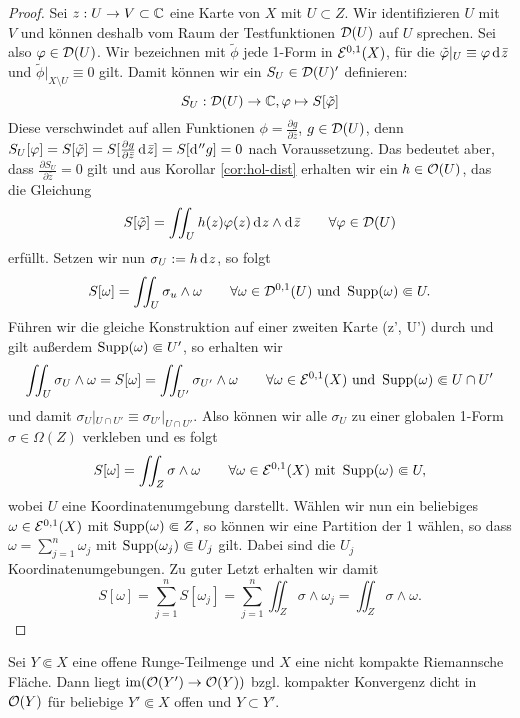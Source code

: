 \begin{proof}
  Sei $z: U \rightarrow V \subset \mathbb{C}$ eine Karte von $X$ mit $U \subset
  Z$. Wir identifizieren $U$ mit $V$ und können deshalb vom Raum der
  Testfunktionen $\mathcal{D}(U)$ auf $U$ sprechen. Sei also $\varphi \in
  \mathcal{D}(U)$. Wir bezeichnen mit $\tilde \phi$ jede 1-Form in
  $\mathcal{E}^{0,1}(X)$, für die $\tilde \phi|_U \equiv \phi \d[\bar z]$ und
  $\tilde \phi |_{X \setminus U} \equiv 0$ gilt. 
  Damit können wir ein $S_U \in \mathcal{D}(U)'$ definieren:
  \[
  S_U: \mathcal{D}(U) \rightarrow \mathbb{C}, \varphi \mapsto S[\tilde {\varphi}]
  \]
  Diese verschwindet auf allen Funktionen $\phi = \frac{\partial
    g}{\partial \bar z}$, $g \in \mathcal{D}(U)$, denn $S_U[\phi] = S[\tilde
  \phi] = S[ \frac{\partial g}{\partial \bar z} \d[\bar z]] =
  S[\d[''g]] = 0$ nach Voraussetzung. Das bedeutet aber, dass
  $\frac{\partial S_U}{\partial \bar z} = 0$ gilt und aus Korollar
  \ref{cor:hol-dist} erhalten wir ein $h \in \mathcal{O}(U)$, das die Gleichung
  \[
  S[\tilde \phi] = \iint_U h(z) \phi(z) \d[z] \wedge \d[\bar z] \qquad
  \forall \phi \in \dist(U)
  \]
  erfüllt. Setzen wir nun $\sigma_U := h \d[z]$, so folgt
  \[
  S[\omega] = \iint_U \sigma_u \wedge \omega \qquad \forall \omega \in
  \mathcal{D}^{0,1}(U) \text{ und } \operatorname{Supp}(\omega) \Subset U.
  \]
  Führen wir die gleiche Konstruktion auf einer zweiten Karte (z', U')
  durch und gilt außerdem $\operatorname{Supp}(\omega) \Subset U'$, so
  erhalten wir
  \[
  \iint_U \sigma_U \wedge \omega = S[\omega] = \iint_{U'} \sigma_{U'}
  \wedge \omega \qquad \forall \omega \in \mathcal{E}^{0,1}(X) \text{ und }
  \operatorname{Supp}(\omega) \Subset U \cap U'
  \]
  und damit $\sigma_U|_{U \cap U'} \equiv \sigma_{U'}|_{U \cap
    U'}$. Also können wir alle $\sigma_U$ zu einer globalen 1-Form
  $\sigma \in \Omega(Z)$ verkleben und es folgt
  \[
  S[\omega] = \iint_Z \sigma \wedge \omega \qquad \forall \omega \in
  \mathcal{E}^{0,1}(X) \text{ mit } \operatorname{Supp}(\omega) \Subset U,
  \]
  wobei $U$ eine Koordinatenumgebung darstellt. 
  Wählen wir nun ein beliebiges $\omega \in \mathcal{E}^{0,1}(X)$ mit
  $\operatorname{Supp}(\omega) \Subset Z$, so können wir eine Partition der 1
  wählen, so dass $\omega = \sum_{j=1}^n \omega_j$ mit
  $\operatorname{Supp}(\omega_j) \Subset U_j$ gilt. Dabei sind die $U_j$
  Koordinatenumgebungen. 
  Zu guter Letzt erhalten wir damit
  \[
  S[\omega] = \sum_{j=1}^n S[\omega_j] = \sum_{j=1}^n \iint_Z \sigma
  \wedge \omega_j = \iint_Z \sigma \wedge \omega.
  \]
\end{proof}

\begin{thm}
  \label{thm:runge-dicht}
  Sei $Y \Subset X$ eine offene Runge-Teilmenge und $X$ eine nicht
  kompakte Riemannsche Fläche. 
  Dann liegt $\operatorname{im}( \mathcal{O}(Y') \rightarrow \mathcal{O}(Y))$ bzgl. kompakter Konvergenz dicht in $\mathcal{O}(Y)$ für beliebige $Y' \Subset X$
  offen und $Y \subset Y'$.
\end{thm}

